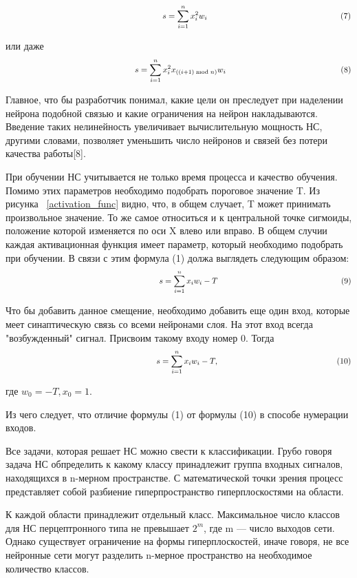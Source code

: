 \documentclass[a4paper,english,russian]{G2-105}
\begin{document}
\[
\ \hspace*{66mm} s = \sum_{i=1}^n x_{i}^{2} w_i  \ \hspace*{56mm} (7)
\] 
\par или даже
\[
\ \hspace*{54mm} s = \sum_{i=1}^n x_{i}^{2} x_{((i+1)\bmod n)} w_i  \ \hspace*{48mm} (8)
\] 
\par Главное, что бы разработчик понимал, какие цели он преследует при наделении нейрона подобной связью и какие ограничения на нейрон накладываются. Введение таких нелинейность увеличивает вычислительную мощность НС, другими словами, позволяет уменьшить число нейронов и связей без потери качества работы[8]. 
\par При обучении НС учитывается не только время процесса и качество обучения. Помимо этих параметров необходимо подобрать пороговое значение T. Из рисунка ~\ref{activation_func} видно, что, в общем случает, T может принимать произвольное значение. То же самое относиться и к центральной точке сигмоиды, положение которой изменяется по оси X влево или вправо. В общем случии каждая активационная функция имеет параметр, который необходимо подобрать при обучении. В связи с этим формула (1) должа выглядеть следующим образом:
\[
\ \hspace*{66mm} s = \sum_{i=1}^n x_{i} w_i-T \ \hspace*{53mm} (9)
\] 
\par Что бы добавить данное смещение, необходимо добавить еще один вход, которые меет синаптическую связь со всеми нейронами слоя. На этот вход всегда "возбужденный" сигнал. Присвоим такому входу номер 0. Тогда
\[
\ \hspace*{64mm} s = \sum_{i=1}^n x_{i} w_i-T, \ \hspace*{50mm} (10)
\] 
\par где $w_0=-T, x_0=1.$
\par Из чего следует, что отличие формулы (1) от формулы (10) в способе нумерации входов.
\par Все задачи, которая решает НС можно свести к классификации. Грубо говоря задача НС обпределить к какому классу принадлежит группа входных сигналов, находящихся в n-мерном пространстве. С математической точки зрения процесс представляет собой разбиение гиперпространство гиперплоскостями на области.
\par К каждой области принадлежит отдельный класс. Максимальное число классов для НС перцептронного типа не превышает $2^m$, где m --- число выходов сети. Однако существует ограничение на формы гиперплоскостей, иначе говоря, не все нейронные сети могут разделить n-мерное пространство на необходимое количество классов.
\end{document}
